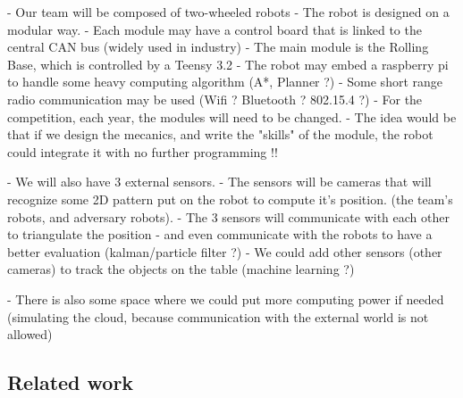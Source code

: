  - Our team will be composed of two-wheeled robots
 - The robot is designed on a modular way.
 - Each module may have a control board that is linked to the central CAN bus (widely used in industry)
 - The main module is the Rolling Base, which is controlled by a Teensy 3.2
 - The robot may embed a raspberry pi to handle some heavy computing algorithm (A*, Planner ?)
 - Some short range radio communication may be used (Wifi ? Bluetooth ? 802.15.4 ?)
 - For the competition, each year, the modules will need to be changed.
 - The idea would be that if we design the mecanics, and write the "skills" of the module, the robot could integrate it with no further programming !!

 - We will also have 3 external sensors.
 - The sensors will be cameras that will recognize some 2D pattern put on the robot to compute it's position. (the team's robots, and adversary robots).
 - The 3 sensors will communicate with each other to triangulate the position
 - and even communicate with the robots to have a better evaluation (kalman/particle filter ?)
 - We could add other sensors (other cameras) to track the objects on the table (machine learning ?)
 
 - There is also some space where we could put more computing power if needed (simulating the cloud, because communication with the external world is not allowed)

\subsection{Related work}


